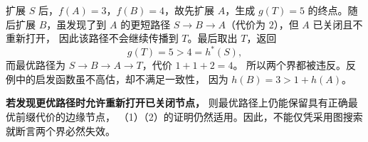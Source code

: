 \documentclass[utf8]{ctexart}
\theoremstyle{mystyle}
\begin{document}
扩展 $S$ 后，$f(A)=3$，$f(B)=4$，故先扩展 $A$，生成
$g(T)=5$ 的终点。随后扩展 $B$，虽发现了到 $A$ 的更短路径
$S\to B\to A$（代价为 $2$），但 $A$ 已关闭且不重新打开，
因此该路径不会继续传播到 $T$。最后取出 $T$，返回
\[
  g(T)=5>4=h^*(S),
\]
而最优路径为 $S\to B\to A\to T$，代价 $1+1+2=4$。
所以两个界都被违反。反例中的启发函数虽不高估，却不满足一致性，
因为 $h(B)=3>1+h(A)$。

\textbf{若发现更优路径时允许重新打开已关闭节点，}
则最优路径上仍能保留具有正确最优前缀代价的边缘节点，
（1）（2）的证明仍然适用。因此，不能仅凭采用图搜索就断言两个界必然失效。

\end{document}
